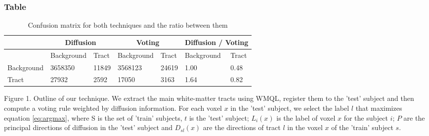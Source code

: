\subsubsection*{Table}

\begin{table}[]
\centering
\caption{Confusion matrix for both techniques and the ratio between them}
\label{my-label}
\begin{tabular}{|l||l|l||l|l||l|l|}
\hline
      & \multicolumn{2}{c||}{Diffusion} & \multicolumn{2}{c||}{Voting} &  \multicolumn{2}{|c|}{Diffusion / Voting} \\ 
      \hline
            & Background  & Tract & Background  & Tract     & Background  & Tract \\
      \hline
Background  & 3658350     & 11849 & 3568123     & 24619     & 1.00        & 0.48   \\
      \hline
Tract       & 27932       & 2592  & 17050       & 3163      & 1.64        & 0.82   \\
\hline
\end{tabular}
\end{table}

Figure 1. Outline of our technique. We extract the main white-matter tracts using WMQL, register them to the 'test' subject and then compute a voting rule weighted by diffusion information. For each voxel $x$ in the 'test' subject, we select the label $l$ that maximizes equation \ref{eq:argmax}, where S is the set of 'train' subjects, $t$ is the 'test' subject; $L_i(x)$ is the label of voxel $x$ for the subject $i$; $P$ are the principal directions of diffusion in the 'test' subject and $D_{sl}(x)$ are the directions of tract $l$ in the voxel $x$ of the 'train' subject $s$.

\chapterbib
